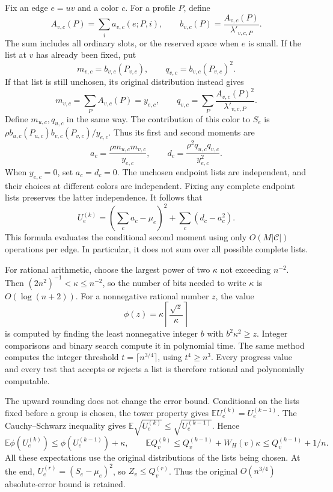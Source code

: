 \documentclass[11pt]{article}
\theoremstyle{definition}\newtheorem{algorithm}{Algorithm}[section]
\numberwithin{equation}{section}
\theoremstyle{remark}\newtheorem*{remark}{Remark}
\newcommand{\E}{\mathbb E}
\begin{document}
Fix an edge $e=uv$ and a color $c$. For a profile $P$, define
\[
 A_{v,c}(P)=\sum_i a_{v,c}(e;P,i),\qquad
 b_{v,c}(P)=\frac{A_{v,c}(P)}{\lambda'_{v,c,P}}.
\]
The sum includes all ordinary slots, or the reserved space when $e$ is
small. If the list at $v$ has already been fixed, put
\[
 m_{v,c}=b_{v,c}(P_{v,c}),\qquad
 q_{v,c}=b_{v,c}(P_{v,c})^2.
\]
If that list is still unchosen, its original distribution instead gives
\[
 m_{v,c}=\sum_P A_{v,c}(P)=y_{e,c},\qquad
 q_{v,c}=\sum_P\frac{A_{v,c}(P)^2}{\lambda'_{v,c,P}}.
\]
Define $m_{u,c},q_{u,c}$ in the same way. The contribution of this color
to $S_e$ is
$\rho b_{u,c}(P_{u,c})b_{v,c}(P_{v,c})/y_{e,c}$.
Thus its first and second moments are
\[
 a_c=\frac{\rho m_{u,c}m_{v,c}}{y_{e,c}},\qquad
 d_c=\frac{\rho^2q_{u,c}q_{v,c}}{y_{e,c}^2}.
\]
When $y_{e,c}=0$, set $a_c=d_c=0$. The unchosen endpoint lists are
independent, and their choices at different colors are independent.
Fixing any complete endpoint lists preserves the latter independence.
It follows that
\begin{equation}\label{eq:progress-moment-formula}
 U_e^{(k)}
 =\left(\sum_c a_c-\mu_e\right)^2
   +\sum_c(d_c-a_c^2).
\end{equation}
This formula evaluates the conditional second moment using only
$O(M|\mathcal C|)$ operations per edge. In particular, it does not sum
over all possible complete lists.

For rational arithmetic, choose the largest power of two $\kappa$ not
exceeding $n^{-2}$. Then $(2n^2)^{-1}<\kappa\le n^{-2}$, so the number of
bits needed to write $\kappa$ is $O(\log(n+2))$. For a nonnegative rational
number $z$, the value
\[
 \phi(z)=\kappa\left\lceil\frac{\sqrt z}{\kappa}\right\rceil
\]
is computed by finding the least nonnegative integer $b$ with
$b^2\kappa^2\ge z$. Integer comparisons and binary search compute it in
polynomial time. The same method computes the integer threshold
$t=\lceil n^{3/4}\rceil$, using $t^4\ge n^3$. Every progress value and
every test that accepts or rejects a list is therefore rational and
polynomially computable.

The upward rounding does not change the error bound. Conditional on the
lists fixed before a group is chosen, the tower property gives
$\E U_e^{(k)}=U_e^{(k-1)}$. The Cauchy--Schwarz inequality gives
$\E\sqrt{U_e^{(k)}}\le\sqrt{U_e^{(k-1)}}$. Hence
\[
 \E\phi(U_e^{(k)})\le\phi(U_e^{(k-1)})+\kappa,
 \qquad
 \E Q_v^{(k)}\le Q_v^{(k-1)}+W_H(v)\kappa
                      \le Q_v^{(k-1)}+1/n.
\]
All these expectations use the original distributions of the lists being
chosen. At the end, $U_e^{(r)}=(S_e-\mu_e)^2$, so
$Z_v\le Q_v^{(r)}$. Thus the original $O(n^{3/4})$ absolute-error bound
is retained.
\end{document}
